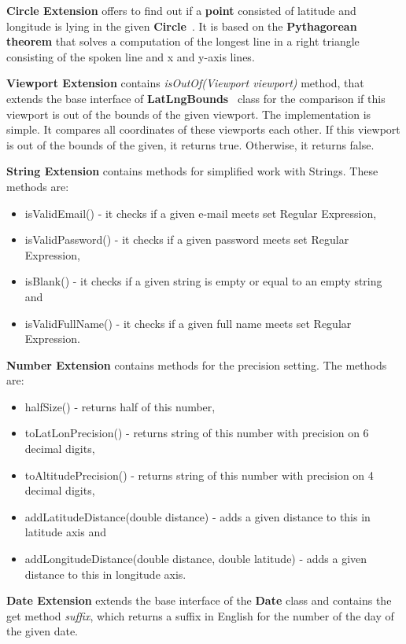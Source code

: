 \textbf{Circle Extension} offers to find out if a \textbf{point} consisted of latitude and longitude is lying in the given \textbf{Circle}~\cite{googleMapsCircles}.
It is based on the \textbf{Pythagorean theorem} that solves a computation of the longest line in a right triangle consisting of the spoken line and x and y-axis lines.

\textbf{Viewport Extension} contains \textit{isOutOf(Viewport viewport)} method, that extends the base interface of \textbf{LatLngBounds}~\cite{latLngBounds} class for the comparison if this viewport is out of the bounds of the given viewport.
The implementation is simple.
It compares all coordinates of these viewports each other.
If this viewport is out of the bounds of the given, it returns true.
Otherwise, it returns false.

\textbf{String Extension} contains methods for simplified work with Strings.
These methods are:
\begin{itemize}
    \item isValidEmail() - it checks if a given e-mail meets set Regular Expression,
    \item isValidPassword() - it checks if a given password meets set Regular Expression,
    \item isBlank() - it checks if a given string is empty or equal to an empty string and
    \item isValidFullName() - it checks if a given full name meets set Regular Expression.
\end{itemize}

\textbf{Number Extension} contains methods for the precision setting.
The methods are:
\begin{itemize}
    \item halfSize() - returns half of this number,
    \item toLatLonPrecision() - returns string of this number with precision on 6 decimal digits,
    \item toAltitudePrecision() - returns string of this number with precision on 4 decimal digits,
    \item addLatitudeDistance(double distance) - adds a given distance to this in latitude axis and
    \item addLongitudeDistance(double distance, double latitude) - adds a given distance to this in longitude axis.
\end{itemize}

\textbf{Date Extension} extends the base interface of the \textbf{Date} class and contains the get method \textit{suffix}, which returns a suffix in English for the number of the day of the given date.

